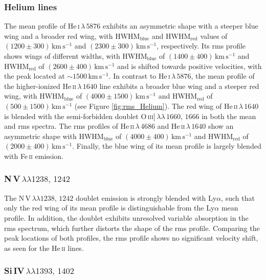 \subsubsection{Helium lines}
The mean profile of He\,\textsc{i}$\,\lambda\,5876$ exhibits an asymmetric shape with a steeper blue wing and a broader red wing, with HWHM$_\mathrm{blue}$ and HWHM$_\mathrm{red}$ values of $(1200 \pm 300)\,\mathrm{km\,s^{-1}}$ and $(2300 \pm 300)\,\mathrm{km\,s^{-1}}$, respectively. Its rms profile shows wings of different widths, with HWHM$_\mathrm{blue}$ of $(1400 \pm 400)\,\mathrm{km\,s^{-1}}$ and  HWHM$_\mathrm{red}$ of $(2600 \pm 400)\,\mathrm{km\,s^{-1}}$ and is shifted towards positive velocities, with the peak located at $\sim 1500\,\mathrm{km\,s^{-1}}$. In contrast to He\,\textsc{i}$\,\lambda\,5876$, the mean profile of the higher-ionized  He\,\textsc{ii}$\,\lambda\,1640$ line exhibits a broader blue wing and a steeper red wing, with HWHM$_\mathrm{blue}$ of $(4000 \pm 1500)\,\mathrm{km\,s^{-1}}$ and HWHM$_\mathrm{red}$ of $(500 \pm 1500)\,\mathrm{km\,s^{-1}}$ (see Figure \ref{fig:rms_Helium}). The red wing of He\,\textsc{ii}$\,\lambda\,1640$ is blended with the semi-forbidden doublet O\,\textsc{iii}]\,$\lambda\lambda\,1660,\,1666$ in both the mean and rms spectra. The rms profiles of He\,\textsc{ii}$\,\lambda\,4686$ and He\,\textsc{ii}$\,\lambda\,1640$ show an asymmetric shape with HWHM$_\mathrm{blue}$ of $(4000 \pm 400)\,\mathrm{km\,s^{-1}}$ and HWHM$_\mathrm{red}$ of $(2000 \pm 400)\,\mathrm{km\,s^{-1}}$. Finally, the blue wing of its mean profile is largely blended with Fe\,\textsc{ii} emission.  



\subsubsection{N\,\textsc{V}$\,\lambda\lambda 1238,\,1242$}

The N\,\textsc{V}$\,\lambda\lambda 1238,\,1242$ doublet emission is strongly blended with Ly$\alpha$, such that only the red wing of its mean profile is distinguishable from the Ly$\alpha$ mean profile. In addition, the doublet exhibits unresolved variable absorption in the rms spectrum, which further distorts the shape of the rms profile. Comparing the peak locations of both profiles, the rms profile shows no significant velocity shift, as seen for the He\,\textsc{ii} lines.

\subsubsection{Si\,\textsc{IV}$\,\lambda\lambda 1393,\,1402$}

